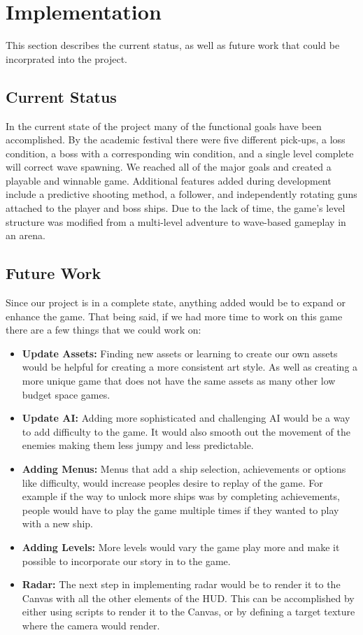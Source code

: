 \documentclass[12pt]{article}       %
\def\hs{\hspace{15pt}}
\begin{document}
\section{Implementation} %
\label{sec:history}
This section describes the current status, as well as future work that could be incorprated into the project.

\subsection{Current Status}

\hs In the current state of the project many of the functional goals have been accomplished. By the academic festival there were five different pick-ups, a loss condition, a boss with a corresponding win condition, and a single level complete will correct wave spawning. We reached all of the major goals and created a playable and winnable game. Additional features added during development include a predictive shooting method, a follower, and independently rotating guns attached to the player and boss ships. Due to the lack of time, the game's level structure was modified from a multi-level adventure to wave-based gameplay in an arena.

\subsection{Future Work}
Since our project is in a complete state, anything added would be to expand or enhance the game. That being said, if we had more time to work on this game there are a few things that we could work on:
\begin{itemize} 
	\item {\bf Update Assets:} Finding new assets or learning to create our own assets would be helpful for creating a more consistent art style. As well as creating a more unique game that does not have the same assets as many other low budget space games.  
	\item {\bf Update AI:} Adding more sophisticated and challenging AI would be a way to add difficulty to the game. It would also smooth out the movement of the enemies making them less jumpy and less predictable. 
	\item {\bf Adding Menus:} Menus that add a  ship selection, achievements or  options like difficulty, would increase peoples desire to replay of the game. For example if the way to unlock more ships was by completing achievements, people would have to play the game multiple times if they wanted to play with a new ship.
	\item {\bf Adding Levels:} More levels would vary the game play more and make it possible to incorporate our story in to the game. 
	\item {\bf Radar:} The next step in implementing radar would be to render it to the Canvas with all the other elements of the HUD. This can be accomplished by either using scripts to render it to the Canvas, or by defining a target texture where the camera would render.
\end{itemize}
\end{document}
